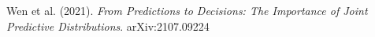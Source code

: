 \documentclass[preview]{standalone}
\begin{document}
Wen et al. (2021). \textit{From Predictions to Decisions: The Importance of Joint Predictive Distributions}. arXiv:2107.09224\\
\end{document}
